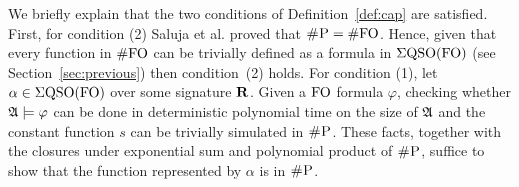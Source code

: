 We briefly explain that the two conditions of Definition~\ref{def:cap} are satisfied. First, for condition (2) Saluja et al. proved that $\text{\sc \#P} = \#{\rm FO}$\cite{SalujaST95}. Hence, given that every function in $\#{\rm FO}$ can be trivially defined as a formula in $\Sigma{\rm QSO}({\rm FO})$ (see Section~\ref{sec:previous}) then condition~(2) holds.
For condition (1), let $\alpha\in\Sigma{\rm QSO}({\rm FO})$ over some signature $\mathbf{R}$. Given a ${\rm FO}$ formula $\varphi$, checking whether $\mathfrak{A}\models\varphi$ can be done in deterministic polynomial time on the size of $\mathfrak{A}$ and the constant function $s$ can be trivially simulated in $\text{\sc \#P}$. These facts, together with the closures under exponential sum and polynomial product of $\text{\sc \#P}$\cite{F97}, suffice to show that the function represented by $\alpha$ is in $\text{\sc \#P}$.
